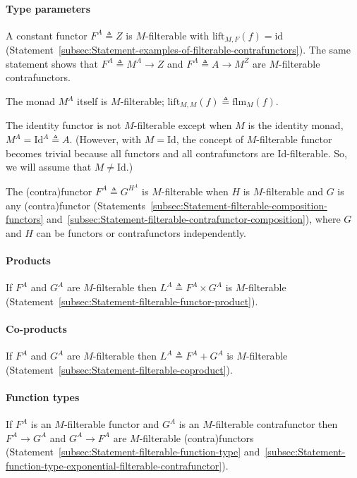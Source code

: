 \paragraph{Type parameters}

A constant functor $F^{A}\triangleq Z$ is $M$-filterable with $\text{lift}_{M,F}(f)=\text{id}$
(Statement~\ref{subsec:Statement-examples-of-filterable-contrafunctors}).
The same statement shows that $F^{A}\triangleq M^{A}\rightarrow Z$
and $F^{A}\triangleq A\rightarrow M^{Z}$ are $M$-filterable contrafunctors.

The monad $M^{A}$ itself is $M$-filterable; $\text{lift}_{M,M}(f)\triangleq\text{flm}_{M}(f)$.

The identity functor is not $M$-filterable except when $M$ is the
identity monad, $M^{A}=\text{Id}^{A}\triangleq A$. (However, with
$M=\text{Id}$, the concept of $M$-filterable functor becomes trivial
because all functors and all contrafunctors are $\text{Id}$-filterable.
So, we will assume that $M\neq\text{Id}$.)

The (contra)functor $F^{A}\triangleq G^{H^{A}}$ is $M$-filterable
when $H$ is $M$-filterable and $G$ is any (contra)functor (Statements~\ref{subsec:Statement-filterable-composition-functors}
and~\ref{subsec:Statement-filterable-contrafunctor-composition}),
where $G$ and $H$ can be functors or contrafunctors independently.

\paragraph{Products}

If $F^{A}$ and $G^{A}$ are $M$-filterable then $L^{A}\triangleq F^{A}\times G^{A}$
is $M$-filterable (Statement~\ref{subsec:Statement-filterable-functor-product}).

\paragraph{Co-products}

If $F^{A}$ and $G^{A}$ are $M$-filterable then $L^{A}\triangleq F^{A}+G^{A}$
is $M$-filterable (Statement~\ref{subsec:Statement-filterable-coproduct}).

\paragraph{Function types}

If $F^{A}$ is an $M$-filterable functor and $G^{A}$ is an $M$-filterable
contrafunctor then $F^{A}\rightarrow G^{A}$ and $G^{A}\rightarrow F^{A}$
are $M$-filterable (contra)functors (Statement~\ref{subsec:Statement-filterable-function-type}
and~\ref{subsec:Statement-function-type-exponential-filterable-contrafunctor}).

